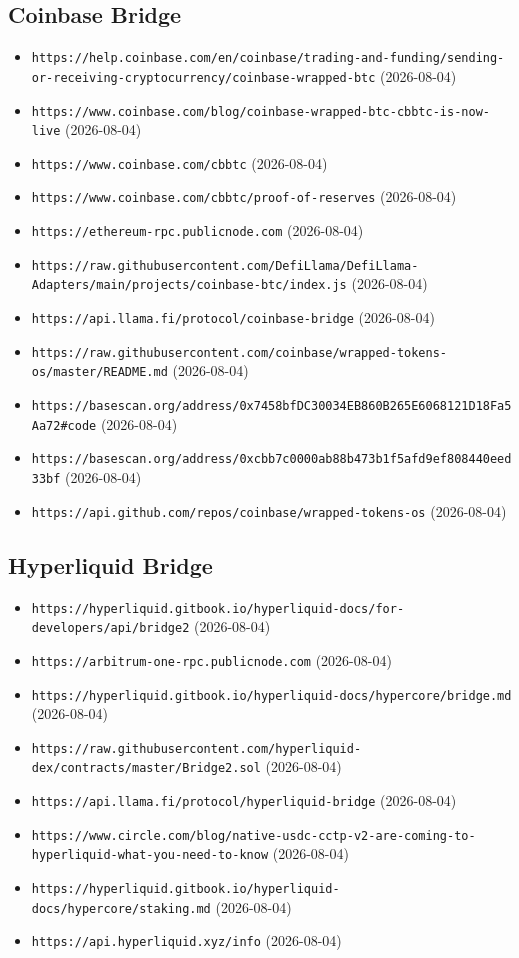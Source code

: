 \subsection*{Coinbase Bridge}
\begin{itemize}\setlength{\itemsep}{0pt}\small
\item \texttt{https://help.coinbase.com/en/coinbase/trading-and-funding/sending-or-receiving-cryptocurrency/coinbase-wrapped-btc} (2026-08-04)
\item \texttt{https://www.coinbase.com/blog/coinbase-wrapped-btc-cbbtc-is-now-live} (2026-08-04)
\item \texttt{https://www.coinbase.com/cbbtc} (2026-08-04)
\item \texttt{https://www.coinbase.com/cbbtc/proof-of-reserves} (2026-08-04)
\item \texttt{https://ethereum-rpc.publicnode.com} (2026-08-04)
\item \texttt{https://raw.githubusercontent.com/DefiLlama/DefiLlama-Adapters/main/projects/coinbase-btc/index.js} (2026-08-04)
\item \texttt{https://api.llama.fi/protocol/coinbase-bridge} (2026-08-04)
\item \texttt{https://raw.githubusercontent.com/coinbase/wrapped-tokens-os/master/README.md} (2026-08-04)
\item \texttt{https://basescan.org/address/0x7458bfDC30034EB860B265E6068121D18Fa5Aa72\#code} (2026-08-04)
\item \texttt{https://basescan.org/address/0xcbb7c0000ab88b473b1f5afd9ef808440eed33bf} (2026-08-04)
\item \texttt{https://api.github.com/repos/coinbase/wrapped-tokens-os} (2026-08-04)
\end{itemize}

\subsection*{Hyperliquid Bridge}
\begin{itemize}\setlength{\itemsep}{0pt}\small
\item \texttt{https://hyperliquid.gitbook.io/hyperliquid-docs/for-developers/api/bridge2} (2026-08-04)
\item \texttt{https://arbitrum-one-rpc.publicnode.com} (2026-08-04)
\item \texttt{https://hyperliquid.gitbook.io/hyperliquid-docs/hypercore/bridge.md} (2026-08-04)
\item \texttt{https://raw.githubusercontent.com/hyperliquid-dex/contracts/master/Bridge2.sol} (2026-08-04)
\item \texttt{https://api.llama.fi/protocol/hyperliquid-bridge} (2026-08-04)
\item \texttt{https://www.circle.com/blog/native-usdc-cctp-v2-are-coming-to-hyperliquid-what-you-need-to-know} (2026-08-04)
\item \texttt{https://hyperliquid.gitbook.io/hyperliquid-docs/hypercore/staking.md} (2026-08-04)
\item \texttt{https://api.hyperliquid.xyz/info} (2026-08-04)
\end{itemize}


